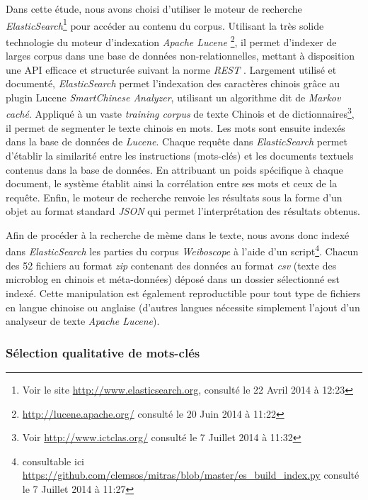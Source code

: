     Dans cette étude, nous avons choisi d'utiliser le moteur de recherche \textit{ElasticSearch}\footnote{Voir le site \url{http://www.elasticsearch.org}, consulté le 22 Avril 2014 à 12:23} pour accéder au contenu du corpus. Utilisant la très solide technologie du  moteur d'indexation \textit{Apache Lucene}  \footnote{ \url{http://lucene.apache.org/} consulté le 20 Juin 2014 à 11:22}, il permet d'indexer de larges corpus dans une base de données non-relationnelles, mettant à disposition une API efficace et structurée suivant la norme \textit{REST} \citep{Masse2012}. Largement utilisé et documenté, \textit{ElasticSearch} permet l'indexation des caractères chinois grâce au plugin Lucene \textit{SmartChinese Analyzer}, utilisant un algorithme dit de \textit{Markov caché}. Appliqué à un vaste \textit{training corpus} de texte Chinois et de dictionnaires\footnote{Voir \url{http://www.ictclas.org/} consulté le 7 Juillet 2014 à 11:32}, il permet de segmenter le texte chinois en mots. Les mots sont ensuite indexés dans la base de données de \textit{Lucene}. Chaque requête dans \textit{ElasticSearch} permet d'établir la similarité entre les instructions (mots-clés) et les  documents textuels contenus dans la base de données. En attribuant un poids spécifique à chaque document, le système établit ainsi la corrélation entre ses mots et ceux de la requête. Enfin, le moteur de recherche renvoie les résultats sous la forme d'un objet au format standard \textit{JSON} qui permet l'interprétation des résultats obtenus.

    Afin de procéder à la recherche de mème dans le texte, nous avons donc indexé dans \textit{ElasticSearch} les parties du corpus \textit{Weiboscope} à l'aide d'un script\footnote{consultable ici \url{https://github.com/clemsos/mitras/blob/master/es_build_index.py} consulté le 7 Juillet 2014 à 11:27}. Chacun des 52 fichiers au format \textit{zip} contenant des données au format \textit{csv} (texte des microblog en chinois et méta-données) déposé dans un dossier sélectionné est indexé. Cette manipulation est également reproductible pour tout type de fichiers en langue chinoise ou anglaise (d'autres langues nécessite simplement l'ajout d'un analyseur de texte \textit{Apache Lucene}).

\subsubsection[Sélection qualitative de mots-clés]{Sélection qualitative de mots-clés}

